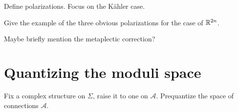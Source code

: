 \documentclass{amsart}
\begin{document}
\begin{definition}[Polarization]
    Define polarizations. Focus on the K\"ahler case.
\end{definition}

\begin{example}
    Give the example of the three obvious polarizations for the case of $\mathbb{R}^{2n}$.
\end{example}

{\color{red} Maybe briefly mention the metaplectic correction?}

\section{Quantizing the moduli space}

Fix a complex structure on $\Sigma$, raise it to one on $\mathscr{A}$. Prequantize the
space of connections $\mathscr{A}$.

\nocite{*}
\printbibliography
\end{document}
